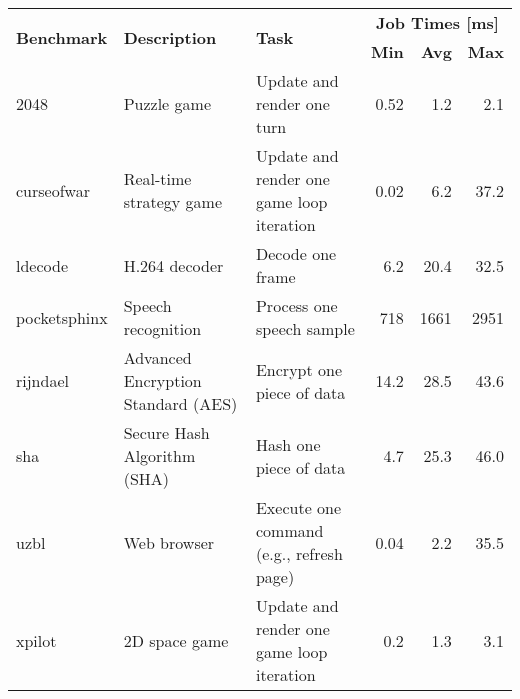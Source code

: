 \begin{tabular}{|l||l|l||r|r|r|}

\hline
\multirow{2}{*}{\bf Benchmark} & \multirow{2}{*}{\bf Description} & \multirow{2}{*}{\bf Task} & \multicolumn{3}{c|}{\bf{Job Times [ms]}} \\ \cline{4-6}
& & & {\bf Min} & {\bf Avg} & {\bf Max} \\ \hline\hline


2048 \cite{2048} & Puzzle game & Update and render one turn &
  0.52 & 1.2 & 2.1 \\ \hline
curseofwar \cite{curseofwar} & Real-time strategy game & Update and render one game loop iteration &
  0.02 & 6.2 & 37.2 \\ \hline
ldecode \cite{ldecode} & H.264 decoder & Decode one frame & 
  6.2 & 20.4 & 32.5 \\ \hline
pocketsphinx \cite{pocketsphinx-icassp06} & Speech recognition & Process one speech sample & 
  718 & 1661 & 2951 \\ \hline
rijndael \cite{mibench} & Advanced Encryption Standard (AES) & Encrypt one piece of data & 
  14.2 & 28.5 & 43.6 \\ \hline
sha \cite{mibench} & Secure Hash Algorithm (SHA) & Hash one piece of data & 
  4.7 & 25.3 & 46.0 \\ \hline
uzbl \cite{uzbl} & Web browser & Execute one command (e.g., refresh page) & 
  0.04 & 2.2 & 35.5 \\ \hline
xpilot \cite{xpilot} & 2D space game & Update and render one game loop iteration & 
  0.2 & 1.3 & 3.1 \\ \hline


\end{tabular}
